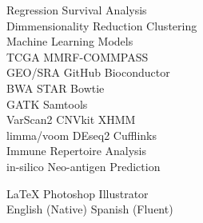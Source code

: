 \begin{minipage}[t]{0.33\textwidth}
Regression \textbullet{} Survival Analysis \textbullet{} \\
Dimmensionality Reduction \textbullet{} 
Clustering \textbullet{} \\
Machine Learning Models \\

TCGA \textbullet{} MMRF-COMMPASS \textbullet{} \\
GEO/SRA \textbullet{} GitHub \textbullet{} Bioconductor \\

BWA \textbullet{} STAR \textbullet{} Bowtie \\

GATK \textbullet{} Samtools \\
VarScan2 \textbullet{} CNVkit \textbullet{} XHMM \\

limma/voom \textbullet{} DEseq2 \textbullet{} Cufflinks \\

Immune Repertoire Analysis \textbullet{} \\
in-silico Neo-antigen Prediction \\
\sectionspace %

\LaTeX \textbullet{} Photoshop \textbullet{} Illustrator \\
English (Native) \textbullet{} Spanish (Fluent)

\sectionspace %

\end{minipage} %
\hfill
%
%
